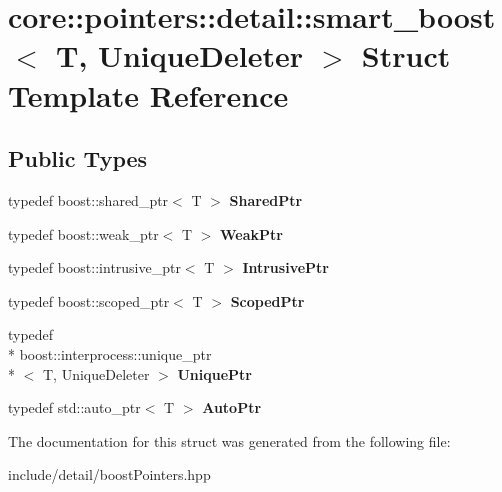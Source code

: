 \hypertarget{structcore_1_1pointers_1_1detail_1_1smart__boost}{\section{core\-:\-:pointers\-:\-:detail\-:\-:smart\-\_\-boost$<$ T, Unique\-Deleter $>$ Struct Template Reference}
\label{structcore_1_1pointers_1_1detail_1_1smart__boost}
}
\subsection*{Public Types}
\begin{DoxyCompactItemize}
\item 
\hypertarget{structcore_1_1pointers_1_1detail_1_1smart__boost_a69d56085d2fe39c25a9365bf540aa664}{typedef boost\-::shared\-\_\-ptr$<$ T $>$ {\bfseries Shared\-Ptr}}\label{structcore_1_1pointers_1_1detail_1_1smart__boost_a69d56085d2fe39c25a9365bf540aa664}

\item 
\hypertarget{structcore_1_1pointers_1_1detail_1_1smart__boost_a3d115544a313d7c5eda3fd6752a6a6d2}{typedef boost\-::weak\-\_\-ptr$<$ T $>$ {\bfseries Weak\-Ptr}}\label{structcore_1_1pointers_1_1detail_1_1smart__boost_a3d115544a313d7c5eda3fd6752a6a6d2}

\item 
\hypertarget{structcore_1_1pointers_1_1detail_1_1smart__boost_a978f6da9bb37e027f3f34ae39b7b7807}{typedef boost\-::intrusive\-\_\-ptr$<$ T $>$ {\bfseries Intrusive\-Ptr}}\label{structcore_1_1pointers_1_1detail_1_1smart__boost_a978f6da9bb37e027f3f34ae39b7b7807}

\item 
\hypertarget{structcore_1_1pointers_1_1detail_1_1smart__boost_a90cb73cadfb3c1803fba4938a7b44425}{typedef boost\-::scoped\-\_\-ptr$<$ T $>$ {\bfseries Scoped\-Ptr}}\label{structcore_1_1pointers_1_1detail_1_1smart__boost_a90cb73cadfb3c1803fba4938a7b44425}

\item 
\hypertarget{structcore_1_1pointers_1_1detail_1_1smart__boost_a29f1b85518ff6654abc4eba0e73dbe58}{typedef \\*
boost\-::interprocess\-::unique\-\_\-ptr\\*
$<$ T, Unique\-Deleter $>$ {\bfseries Unique\-Ptr}}\label{structcore_1_1pointers_1_1detail_1_1smart__boost_a29f1b85518ff6654abc4eba0e73dbe58}

\item 
\hypertarget{structcore_1_1pointers_1_1detail_1_1smart__boost_a7df96a915a1d84f363bdf98699974d28}{typedef std\-::auto\-\_\-ptr$<$ T $>$ {\bfseries Auto\-Ptr}}\label{structcore_1_1pointers_1_1detail_1_1smart__boost_a7df96a915a1d84f363bdf98699974d28}

\end{DoxyCompactItemize}


The documentation for this struct was generated from the following file\-:\begin{DoxyCompactItemize}
\item 
include/detail/boost\-Pointers.\-hpp\end{DoxyCompactItemize}
